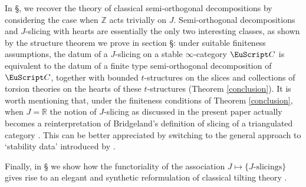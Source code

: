 In §, we recover the theory of classical semi-orthogonal decompositions by considering the case when $\mathbb{Z}$ acts trivially on $J$. Semi-orthogonal decompositions and $J$-slicing with hearts are essentially the only two interesting classes, as shown by the structure theorem we prove in section §: under suitable finiteness assumptions, the datum of a $J$-slicing on a stable $\infty$-category $\C$ is equivalent to the datum of a finite type semi-orthogonal decomposition of $\C$, together with bounded $t$-structures on the slices and collections of torsion theories  on the hearts of these $t$-structures (Theorem \ref{conclusion}). It is worth mentioning that, under the finiteness conditions of Theorem \ref{conclusion}, when $J=\mathbb{R}$ the notion of $J$-slicing as discussed in the present paper actually becomes a reinterpretation of Bridgeland's definition of slicing of a triangulated category \cite{Brid}. This can be better appreciated by switching to the general approach to `stability data' introduced by \cite{GKR}. 

Finally, in § we show how the functoriality of the association $J\mapsto \{\text{$J$-slicings}\}$ gives rise to an elegant and synthetic reformulation of classical tilting theory \cite{happel}.